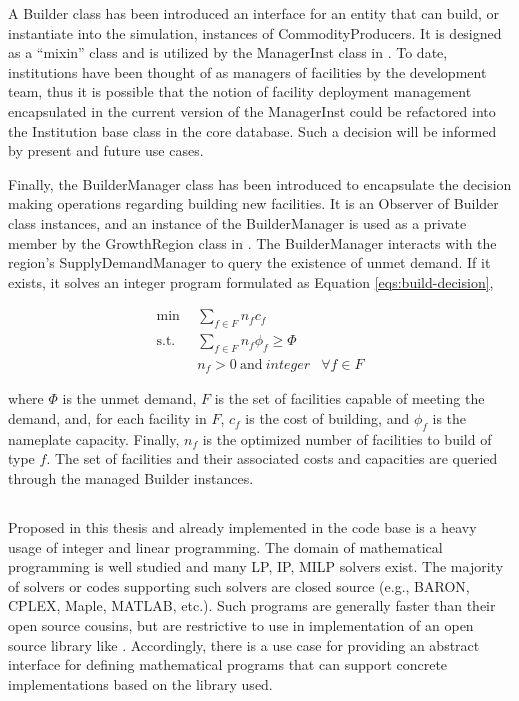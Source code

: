 A Builder class has been introduced an interface for an entity that can build,
or instantiate into the simulation, instances of CommodityProducers. It is
designed as a ``mixin'' class and is utilized by the ManagerInst class in
\Cycamore. To date, institutions have been thought of as managers of facilities
by the \Cyclus development team, thus it is possible that the notion of facility
deployment management encapsulated in the current version of the ManagerInst
could be refactored into the Institution base class in the \Cyclus core
database. Such a decision will be informed by present and future use cases.

Finally, the BuilderManager class has been introduced to encapsulate the
decision making operations regarding building new facilities. It is an Observer
of Builder class instances, and an instance of the BuilderManager is used as a
private member by the GrowthRegion class in \Cycamore. The BuilderManager
interacts with the region's SupplyDemandManager to query the existence of unmet
demand. If it exists, it solves an integer program formulated as Equation
\ref{eqs:build-decision},

\begin{subequations}\label{eqs:build-decision}
  \begin{align}
    \min \:\: & 
    \sum_{f \in F} n_f c_f
    & \\
    \text{s.t.} \:\: &
    \sum_{f \in F} n_f \phi_f \ge \Phi
    & \\
    &
    n_f > 0 \: \text{and} \: integer
    &
    \forall f \in F
  \end{align}
\end{subequations}
  
where $\Phi$ is the unmet demand, $F$ is the set of facilities capable of
meeting the demand, and, for each facility in $F$, $c_f$ is the cost of
building, and $\phi_f$ is the nameplate capacity.  Finally, $n_f$ is the
optimized number of facilities to build of type $f$. The set of facilities and
their associated costs and capacities are queried through the managed Builder
instances.

\subsection{\Cyclopts}

Proposed in this thesis and already implemented in the \Cyclus code base is a
heavy usage of integer and linear programming. The domain of mathematical
programming is well studied and many LP, IP, MILP solvers exist. The majority of
solvers or codes supporting such solvers are closed source (e.g., BARON, CPLEX,
Maple, MATLAB, etc.). Such programs are generally faster than their open source
cousins, but are restrictive to use in implementation of an open source library
like \Cyclus. Accordingly, there is a use case for providing an abstract
interface for defining mathematical programs that can support concrete
implementations based on the library used.

